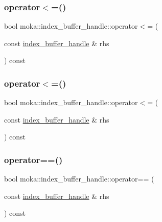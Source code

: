 \mbox{\label{structmoka_1_1index__buffer__handle_afdd908565d55f85594f71ba090a8625e}} 
\subsubsection{\texorpdfstring{operator$<$=()}{operator<=()}\hspace{0.1cm}{\footnotesize\ttfamily [1/2]}}
{\footnotesize\ttfamily bool moka\+::index\+\_\+buffer\+\_\+handle\+::operator$<$= (\begin{DoxyParamCaption}\item[{const \mbox{\hyperlink{structmoka_1_1index__buffer__handle}{index\+\_\+buffer\+\_\+handle}} \&}]{rhs }\end{DoxyParamCaption}) const}

\mbox{\label{structmoka_1_1index__buffer__handle_afdd908565d55f85594f71ba090a8625e}} 
\subsubsection{\texorpdfstring{operator$<$=()}{operator<=()}\hspace{0.1cm}{\footnotesize\ttfamily [2/2]}}
{\footnotesize\ttfamily bool moka\+::index\+\_\+buffer\+\_\+handle\+::operator$<$= (\begin{DoxyParamCaption}\item[{const \mbox{\hyperlink{structmoka_1_1index__buffer__handle}{index\+\_\+buffer\+\_\+handle}} \&}]{rhs }\end{DoxyParamCaption}) const}

\mbox{\label{structmoka_1_1index__buffer__handle_a72330025c9b54275476c8cd789e7c262}} 
\subsubsection{\texorpdfstring{operator==()}{operator==()}\hspace{0.1cm}{\footnotesize\ttfamily [1/2]}}
{\footnotesize\ttfamily bool moka\+::index\+\_\+buffer\+\_\+handle\+::operator== (\begin{DoxyParamCaption}\item[{const \mbox{\hyperlink{structmoka_1_1index__buffer__handle}{index\+\_\+buffer\+\_\+handle}} \&}]{rhs }\end{DoxyParamCaption}) const}


